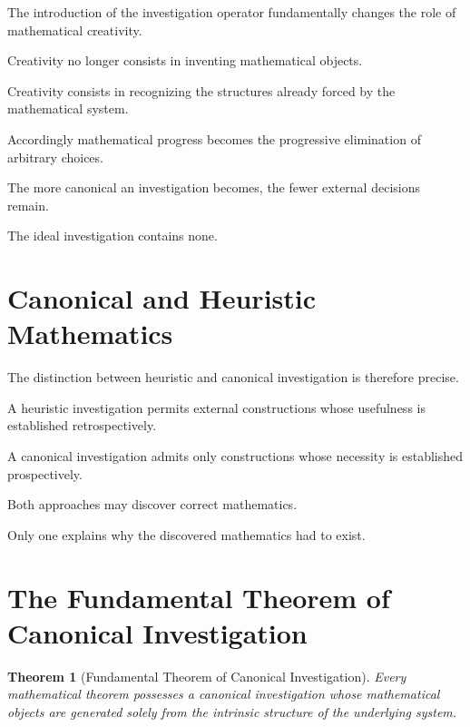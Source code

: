 \documentclass[13pt,openany]{book}
\theoremstyle{plain}
\newtheorem{theorem}{Theorem}[chapter]
\theoremstyle{definition}
\begin{document}
The introduction of the investigation operator fundamentally changes the role
of mathematical creativity.

Creativity no longer consists in inventing mathematical objects.

Creativity consists in recognizing the structures already forced by the
mathematical system.

Accordingly mathematical progress becomes the progressive elimination of
arbitrary choices.

The more canonical an investigation becomes, the fewer external decisions
remain.

The ideal investigation contains none.

\section{Canonical and Heuristic Mathematics}

The distinction between heuristic and canonical investigation is therefore
precise.

A heuristic investigation permits external constructions whose usefulness is
established retrospectively.

A canonical investigation admits only constructions whose necessity is
established prospectively.

Both approaches may discover correct mathematics.

Only one explains why the discovered mathematics had to exist.

\section{The Fundamental Theorem of Canonical Investigation}

\begin{theorem}[Fundamental Theorem of Canonical Investigation]
Every mathematical theorem possesses a canonical investigation whose
mathematical objects are generated solely from the intrinsic structure of the
underlying system.
\end{theorem}
\end{document}
